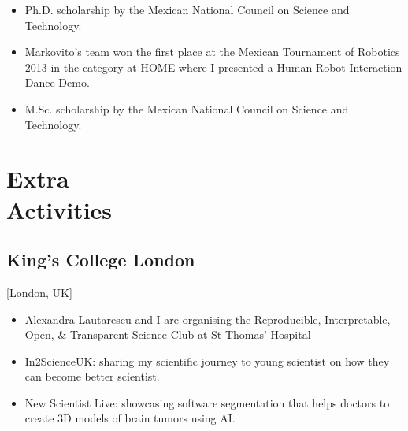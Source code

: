 \documentclass{mycv}
\begin{document}
\begin{itemize}
\item Ph.D. scholarship by the Mexican National Council on Science and Technology. 

\item Markovito's team  won the first place at the Mexican Tournament of Robotics 2013 in the category at HOME where I presented a Human-Robot Interaction Dance Demo. \href{https://www.youtube.com/watch?v=Kw-lZam_qZI}{\faYoutube} 

\item M.Sc. scholarship by the Mexican National Council on Science and Technology. 
\end{itemize}



\section{Extra \\ Activities}
\subsection{King's College London}[London, UK]
\begin{positions}
\end{positions}
\begin{itemize}
\item Alexandra Lautarescu and I are organising 
the Reproducible, Interpretable, Open, \& Transparent Science Club
at St Thomas' Hospital 
\item In2ScienceUK: sharing my scientific journey to young
scientist on how they can become better scientist.  
\item New Scientist Live: showcasing software segmentation
that helps doctors to create 3D models of brain tumors using AI.  
\end{itemize}
\end{document}
